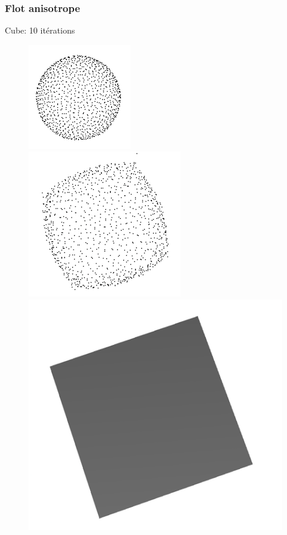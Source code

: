 \documentclass{beamer}
\begin{document}
\begin{frame}
    \frametitle{Flot anisotrope}

    Cube: 10 itérations
    \begin{figure}
        \centering
        \includegraphics[scale=0.4]{img/sphere-cube-0}
        \includegraphics[scale=0.3]{img/sphere-cube-10}
        \includegraphics[scale=0.2]{img/sphere-cube-cube}
    \end{figure}


\end{frame}
\end{document}
